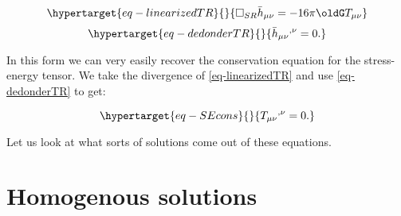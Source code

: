 \documentclass[
  letterpaper,
  DIV=11,
  numbers=noendperiod,
  oneside]{scrreprt}
\begin{document}
\begin{equation}\protect\hypertarget{eq-linearizedTR}{}{
\square_{SR} \mathtip{\texttip{\bar{h}}{trace reversed weak metric tensor}_{\mu\nu}}{{\text{trace reversed weak covariant metric tensor component: } \texttip{\bar{h}}{trace reversed weak metric tensor}_{\mu\nu} = \texttip{\texttip{h}{weak metric tensor}_{{\mu\nu}}}{weak covariant metric tensor component}-\frac{1}{2}\texttip{\texttip{h}{weak metric tensor}^{\alpha}_{\phantom{\alpha}\alpha}}{weak metric tensor trace}\texttip{\texttip{\eta}{Minkoski metric tensor +---}_{\mu\nu}}{covariant Minkoski metric components +---}}}= -16\pi \oldG\texttip{\texttip{T}{Stress-Energy tensor, or energy-momentum tensor}_{{\mu\nu}}}{covariant Stress-Energy tensor component}
}\label{eq-linearizedTR}\end{equation}
\begin{equation}\protect\hypertarget{eq-dedonderTR}{}{
    \mathtip{\texttip{\bar{h}}{trace reversed weak metric tensor}_{\mu\nu}}{{\text{trace reversed weak covariant metric tensor component: } \texttip{\bar{h}}{trace reversed weak metric tensor}_{\mu\nu} = \texttip{\texttip{h}{weak metric tensor}_{{\mu\nu}}}{weak covariant metric tensor component}-\frac{1}{2}\texttip{\texttip{h}{weak metric tensor}^{\alpha}_{\phantom{\alpha}\alpha}}{weak metric tensor trace}\texttip{\texttip{\eta}{Minkoski metric tensor +---}_{\mu\nu}}{covariant Minkoski metric components +---}}}\texttip{{}^{,\nu}}{Partial derivative}=0. 
}\label{eq-dedonderTR}\end{equation}

In this form we can very easily recover the conservation equation for
the stress-energy tensor. We take the divergence of
\ref{eq-linearizedTR} and use \ref{eq-dedonderTR} to get:

\begin{equation}\protect\hypertarget{eq-SEcons}{}{
    \texttip{\texttip{T}{Stress-Energy tensor, or energy-momentum tensor}_{{\mu\nu}}}{covariant Stress-Energy tensor component}\texttip{{}^{,\nu}}{Partial derivative}=0.
}\label{eq-SEcons}\end{equation}

Let us look at what sorts of solutions come out of these equations.

\hypertarget{homogenous-solutions}{%
\section{Homogenous solutions}\label{homogenous-solutions}}
\end{document}
